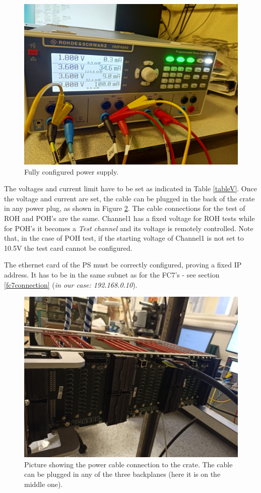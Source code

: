 \documentclass[10pt,a4paper]{article}
\begin{document}
\begin{figure}[h!]
\centering
 \includegraphics[width=0.7\linewidth]{PowerSupply.jpeg} 
  \caption{Fully configured power supply.}
  \label{PhotoPowerConnection}
\end{figure}

The voltages and current limit have to be set as indicated in Table \ref{tableV}. Once the voltage and current are set, the cable can be plugged in the back of the crate in any power plug, as shown in Figure \ref{PhotoPowerConnectionCrate}.
The cable connections for the test of ROH and POH's are the same. Channel1 has a fixed voltage for ROH tests while for POH's it becomes a {\it Test channel} and its voltage is remotely controlled. Note that, in the case of POH test, if the starting voltage of Channel1 is not set to 10.5V the test card cannot be configured.  
\par The ethernet card of the PS must be correctly configured, proving a fixed IP address. It has to be in the same subnet as for the FC7's - see section \ref{fc7connection} ({\it in our case: 192.168.0.10}).

\begin{figure}[h!]
\centering
 \includegraphics[width=0.7\linewidth]{PowerCable.jpeg} 
  \caption{Picture showing the power cable connection to the crate. The cable can be plugged in any of the three backplanes (here it is on the middle one).}
  \label{PhotoPowerConnectionCrate}
\end{figure}
\end{document}
